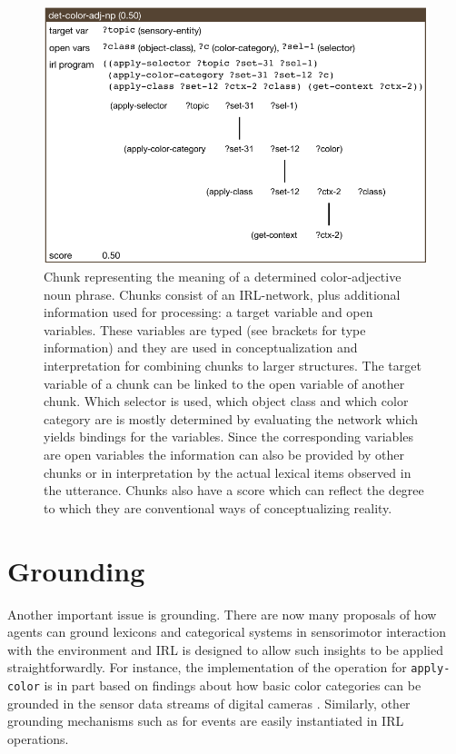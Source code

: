 \begin{figure}
\center
\includegraphics[width=1.0\columnwidth]{figs/det-color-adj-np-chunk}
\caption[Color-adjective noun phrase chunk]{Chunk representing the 
meaning of a determined color-adjective noun phrase. Chunks consist 
of an IRL-network, plus additional information used for processing: 
a target variable and open variables. These variables are typed 
(see brackets for type information)
and they are used in conceptualization and interpretation for combining chunks
to larger structures. The target variable of a chunk can be linked to the open
variable of another chunk. Which selector is used, 
which object class and which color category are is mostly
determined by evaluating the network which yields bindings for
the variables. Since the corresponding variables are open variables
the information can also be provided by other chunks or in interpretation
by the actual lexical items observed in the utterance. Chunks also have a score
which can reflect the degree to which they are conventional 
ways of conceptualizing reality.}
\label{f:the-red-block-chunk}
\end{figure}


\section{Grounding}
Another important issue is grounding. 
There are now many proposals of how agents can ground lexicons and 
categorical systems in sensorimotor interaction with the environment 
\citep{billard1998grounding,vogt2001bootstrapping,steels2008grounding} and 
IRL is designed to allow such 
insights to be applied straightforwardly. For instance, the 
implementation of the operation for {\footnotesize\texttt{apply-color}} is in part based on 
findings about how basic color categories can be grounded in the sensor 
data streams of digital cameras \citep{steels2005coordinating,bleys2009grounded}.
Similarly, other grounding mechanisms such as for events 
\citep{siskind2001grounding,steels2003events} are easily instantiated in IRL operations. 


